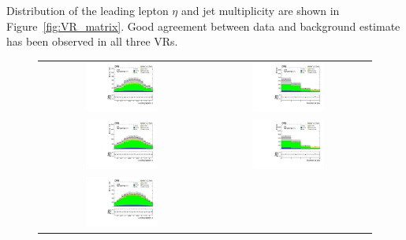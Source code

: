 Distribution of the leading lepton $\eta$ and jet multiplicity are shown in Figure~\ref{fig:VR_matrix}. Good agreement between data and background estimate has been observed in all three \acp{VR}.

\begin{figure}[tbh!]
 \begin{center}
 \begin{tabular}{cc}
 \includegraphics[width=0.45\textwidth]{figures/Part3/Nonprompt/VR/eee/lep1Eta}&
 \includegraphics[width=0.45\textwidth]{figures/Part3/Nonprompt/VR/eee/njet} \\
   \includegraphics[width=0.45\textwidth]{figures/Part3/Nonprompt/VR/emul/lep1Eta}&
 \includegraphics[width=0.45\textwidth]{figures/Part3/Nonprompt/VR/emul/njet} \\
    \includegraphics[width=0.45\textwidth]{figures/Part3/Nonprompt/VR/mumumu/lep1Eta}&

\end{tabular}
\end{center}
\end{figure}
